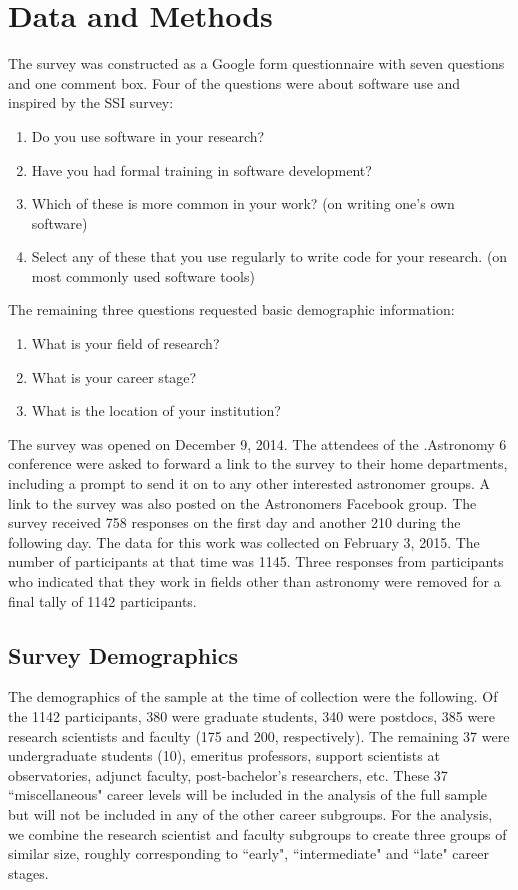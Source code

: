 \section{Data and Methods}
\label{sec:datamethods}

The survey was constructed as a Google form questionnaire with seven questions and one comment box. Four of the questions were about software use and inspired by the SSI survey:
\begin{enumerate}
\item Do you use software in your research?
\item Have you had formal training in software development?
\item Which of these is more common in your work? (on writing one's own software)
\item Select any of these that you use regularly to write code for your research. (on most commonly used software tools)
\end{enumerate}
The remaining three questions requested basic demographic information:
\begin{enumerate}
\item What is your field of research?
\item What is your career stage?
\item What is the location of your institution?
\end{enumerate}

The survey was opened on December 9, 2014. The attendees of the .Astronomy 6 conference were asked to forward a link to the survey to their home departments, including a prompt to send it on to any other interested astronomer groups. A link to the survey was also posted on the Astronomers Facebook group. The survey received 758 responses on the first day and another 210 during the following day. The data for this work was collected on February 3, 2015. The number of participants at that time was 1145. Three responses from participants who indicated that they work in fields other than astronomy were removed for a final tally of 1142 participants.

\subsection{Survey Demographics}

The demographics of the sample at the time of collection were the following. Of the 1142 participants, 380 were graduate students, 340 were postdocs, 385 were research scientists and faculty (175 and 200, respectively). The remaining 37 were undergraduate students (10), emeritus professors, support scientists at observatories, adjunct faculty, post-bachelor's researchers, etc. These 37 ``miscellaneous" career levels will be included in the analysis of the full sample but will not be included in any of the other career subgroups. For the analysis, we combine the research scientist and faculty subgroups to create three groups of similar size, roughly corresponding to ``early", ``intermediate" and ``late" career stages.

